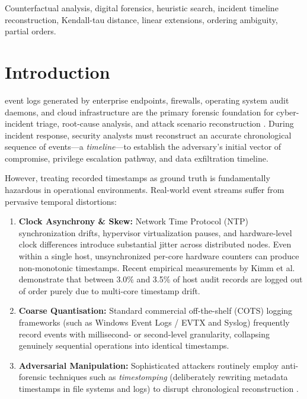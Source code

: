 \documentclass[journal]{IEEEtran}
\begin{document}
\begin{IEEEkeywords}
Counterfactual analysis, digital forensics, heuristic search, incident timeline reconstruction, Kendall-tau distance, linear extensions, ordering ambiguity, partial orders.
\end{IEEEkeywords}

\section{Introduction}
 event logs generated by enterprise endpoints, firewalls, operating system audit daemons, and cloud infrastructure are the primary forensic foundation for cyber-incident triage, root-cause analysis, and attack scenario reconstruction \cite{Hossain2017, Cheng2024}. During incident response, security analysts must reconstruct an accurate chronological sequence of events---a \emph{timeline}---to establish the adversary's initial vector of compromise, privilege escalation pathway, and data exfiltration timeline.

However, treating recorded timestamps as ground truth is fundamentally hazardous in operational environments. Real-world event streams suffer from pervasive temporal distortions:
\begin{enumerate}
    \item \textbf{Clock Asynchrony \& Skew:} Network Time Protocol (NTP) synchronization drifts, hypervisor virtualization pauses, and hardware-level clock differences introduce substantial jitter across distributed nodes. Even within a single host, unsynchronized per-core hardware counters can produce non-monotonic timestamps. Recent empirical measurements by Kimm et al. \cite{Kimm2026} demonstrate that between 3.0\% and 3.5\% of host audit records are logged out of order purely due to multi-core timestamp drift.
    \item \textbf{Coarse Quantisation:} Standard commercial off-the-shelf (COTS) logging frameworks (such as Windows Event Logs / EVTX and Syslog) frequently record events with millisecond- or second-level granularity, collapsing genuinely sequential operations into identical timestamps.
    \item \textbf{Adversarial Manipulation:} Sophisticated attackers routinely employ anti-forensic techniques such as \emph{timestomping} (deliberately rewriting metadata timestamps in file systems and logs) to disrupt chronological reconstruction \cite{Peisert2007}.
\end{enumerate}
\end{document}
